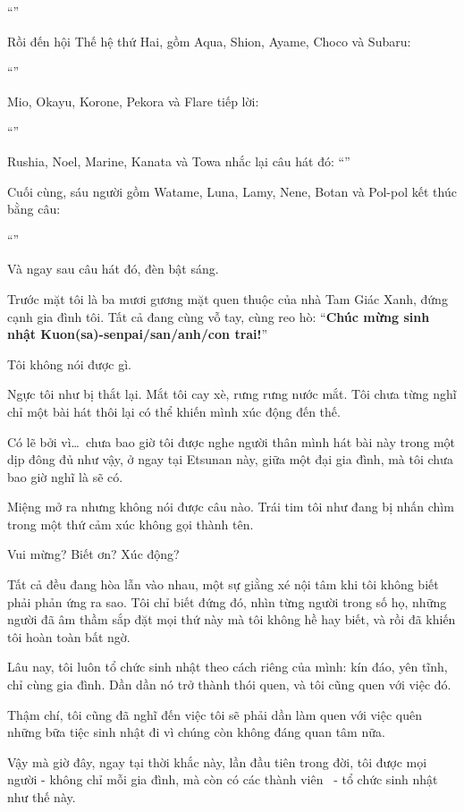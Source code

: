 \documentclass[../main.tex]{subfiles}
\begin{document}
``''

Rồi đến hội Thế hệ thứ Hai, gồm Aqua, Shion, Ayame, Choco và Subaru:

``''

Mio, Okayu, Korone, Pekora và Flare tiếp lời:

``''

Rushia, Noel, Marine, Kanata và Towa nhắc lại câu hát đó: ``''

Cuối cùng, sáu người gồm Watame, Luna, Lamy, Nene, Botan và Pol-pol kết thúc bằng câu:

``''

Và ngay sau câu hát đó, đèn bật sáng.

Trước mặt tôi là ba mươi gương mặt quen thuộc của nhà Tam Giác Xanh, đứng cạnh gia đình tôi. Tất cả đang cùng vỗ tay, cùng reo hò: ``\textbf{Chúc mừng sinh nhật Kuon(sa)-senpai/san/anh/con trai!}''

Tôi không nói được gì.

Ngực tôi như bị thắt lại. Mắt tôi cay xè, rưng rưng nước mắt. Tôi chưa từng nghĩ chỉ một bài hát thôi lại có thể khiến mình xúc động đến thế.

Có lẽ bởi vì\dots\ chưa bao giờ tôi được nghe người thân mình hát bài này trong một dịp đông đủ như vậy, ở ngay tại Etsunan này, giữa một đại gia đình, mà tôi chưa bao giờ nghĩ là sẽ có.

Miệng mở ra nhưng không nói được câu nào. Trái tim tôi như đang bị nhấn chìm trong một thứ cảm xúc không gọi thành tên.

Vui mừng? Biết ơn? Xúc động?

Tất cả đều đang hòa lẫn vào nhau, một sự giằng xé nội tâm khi tôi không biết phải phản ứng ra sao. Tôi chỉ biết đứng đó, nhìn từng người trong số họ, những người đã âm thầm sắp đặt mọi thứ này mà tôi không hề hay biết, và rồi đã khiến tôi hoàn toàn bất ngờ.

Lâu nay, tôi luôn tổ chức sinh nhật theo cách riêng của mình: kín đáo, yên tĩnh, chỉ cùng gia đình. Dần dần nó trở thành thói quen, và tôi cũng quen với việc đó.

Thậm chí, tôi cũng đã nghĩ đến việc tôi sẽ phải dần làm quen với việc quên những bữa tiệc sinh nhật đi vì chúng còn không đáng quan tâm nữa.

Vậy mà giờ đây, ngay tại thời khắc này, lần đầu tiên trong đời, tôi được mọi người - không chỉ mỗi gia đình, mà còn có các thành viên \hll\ - tổ chức sinh nhật như thế này.
\end{document}

